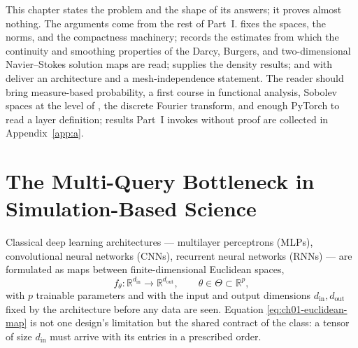 This chapter states the problem and the shape of its answers; it proves almost
nothing. The arguments come from the rest of Part~I.
 fixes the spaces, the norms,
and the compactness machinery;
 records the estimates from which the continuity and smoothing
properties of the Darcy, Burgers, and two-dimensional Navier--Stokes solution maps are read;
 supplies the density results;
and  with
 deliver an architecture and a
mesh-independence statement. The reader should bring measure-based probability, a first
course in functional analysis, Sobolev spaces at the level of
\cite{brezis2011functional, evans2010partial}, the discrete Fourier transform, and enough
PyTorch to read a layer definition; results Part~I invokes without proof are collected in
Appendix~\ref{app:a}.

\section{The Multi-Query Bottleneck in Simulation-Based Science}

Classical deep learning architectures --- multilayer perceptrons
(MLPs), convolutional neural networks
(CNNs), recurrent neural networks
(RNNs) --- are formulated as maps between
finite-dimensional Euclidean spaces,
\begin{equation}
  \label{eq:ch01-euclidean-map}
  f_\theta : \mathbb{R}^{d_{\text{in}}} \longrightarrow \mathbb{R}^{d_{\text{out}}}, \qquad \theta \in \Theta \subset \mathbb{R}^p,
\end{equation}
with $p$ trainable parameters and with the input and output dimensions $d_{\text{in}},
d_{\text{out}}$ fixed by the architecture before any data are seen. Equation
\eqref{eq:ch01-euclidean-map} is not one design's limitation but the shared contract of the
class: a tensor of size $d_{\text{in}}$ must arrive with its entries in a prescribed order.

